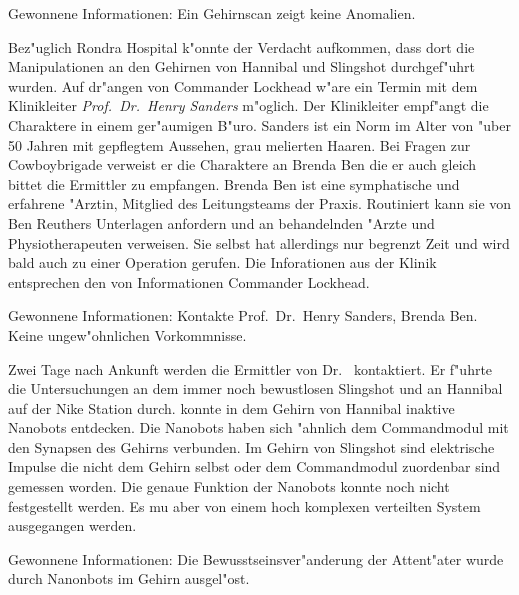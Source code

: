 \begin{remarks}
	Gewonnene Informationen: Ein Gehirnscan zeigt keine Anomalien.
\end{remarks}



Bez"uglich Rondra Hospital k"onnte der Verdacht aufkommen, dass dort die Manipulationen an den Gehirnen von Hannibal und Slingshot durchgef"uhrt wurden. Auf dr"angen von Commander Lockhead w"are ein Termin mit dem Klinikleiter \emph{Prof.~Dr.~Henry Sanders} m"oglich. Der Klinikleiter empf"angt die Charaktere in einem ger"aumigen B"uro. Sanders ist ein Norm im Alter von "uber 50 Jahren mit gepflegtem Aussehen, grau melierten Haaren. Bei Fragen zur Cowboybrigade verweist er die Charaktere an Brenda Ben die er auch gleich bittet die Ermittler zu empfangen. Brenda Ben ist eine symphatische und erfahrene "Arztin, Mitglied des Leitungsteams der Praxis. Routiniert kann sie von Ben Reuthers Unterlagen anfordern und an behandelnden "Arzte und Physiotherapeuten verweisen. Sie selbst hat allerdings nur begrenzt Zeit und wird bald auch zu einer Operation gerufen. Die Inforationen aus der Klinik entsprechen den von Informationen Commander Lockhead.

\begin{remarks}
	Gewonnene Informationen: Kontakte Prof.~Dr.~Henry Sanders, Brenda Ben. Keine ungew"ohnlichen Vorkommnisse.
\end{remarks}



Zwei Tage nach Ankunft werden die Ermittler von Dr.~  kontaktiert. Er f"uhrte die Untersuchungen an dem immer noch bewustlosen Slingshot und an Hannibal auf der Nike Station durch.   konnte in dem Gehirn von Hannibal inaktive Nanobots entdecken. Die Nanobots haben sich "ahnlich dem Commandmodul mit den Synapsen des Gehirns verbunden. Im Gehirn von Slingshot sind elektrische Impulse die nicht dem Gehirn selbst oder dem Commandmodul zuordenbar sind gemessen worden. Die genaue Funktion der Nanobots konnte noch nicht festgestellt werden. Es mu\3 aber von einem hoch komplexen verteilten System ausgegangen werden.

\begin{remarks}
	Gewonnene Informationen: Die Bewusstseinsver"anderung der Attent"ater wurde durch Nanonbots im Gehirn ausgel"ost.
\end{remarks}



